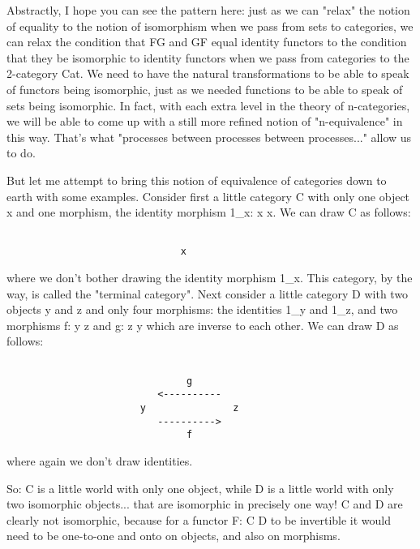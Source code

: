 Abstractly, I hope you can see the pattern here: just as we can "relax"
the notion of equality to the notion of isomorphism when we pass from
sets to categories, we can relax the condition that FG and GF equal
identity functors to the condition that they be isomorphic to identity
functors when we pass from categories to the 2-category Cat.  We need to
have the natural transformations to be able to speak of functors being
isomorphic, just as we needed functions to be able to speak of sets
being isomorphic.   In fact, with each extra level in the theory of
n-categories, we will be able to come up with a still more refined
notion of "n-equivalence" in this way.  That's what "processes between
processes between processes..." allow us to do.

But let me attempt to bring this notion of equivalence of categories
down to earth with some examples.  Consider first a little category
C with only one object x and one morphism, the identity morphism 
1_{x}: x \to  x.  We can draw C as follows:


\begin{verbatim}

                              x

\end{verbatim}
    
where we don't bother drawing the identity morphism 1_{x}.  This
category, by the way, is called the "terminal category".  Next
consider a little category D with two objects y and z and only four
morphisms: the identities 1_{y} and 1_{z}, and 
two morphisms f: y \to  z
and g: z \to  y which are inverse to each other.  We can draw D as
follows:
     

\begin{verbatim}

                               g
                          <----------
                       y               z
                          ---------->
                               f

\end{verbatim}
    
where again we don't draw identities.  

So: C is a little world with only one object, while D is a little world
with only two isomorphic objects... that are isomorphic in precisely one
way!  C and D are clearly not isomorphic, because for a functor F: C \to 
D to be invertible it would need to be one-to-one and onto on objects,
and also on morphisms. 

